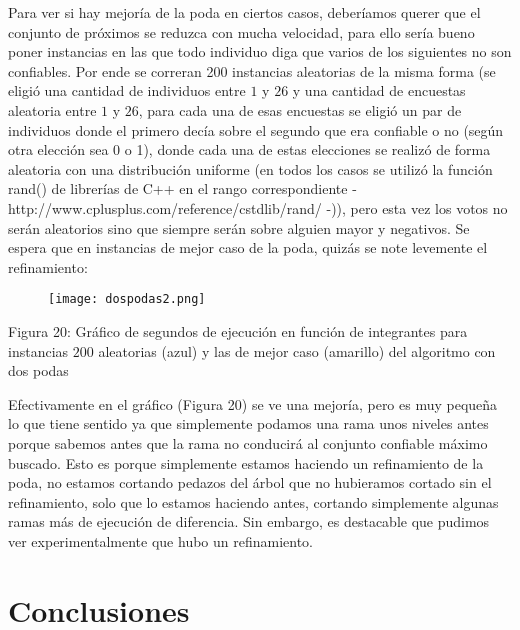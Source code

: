 \documentclass[A4paper,oneside,fleqn,10pt]{article}
\theoremstyle{definition}
\begin{document}
Para ver si hay mejoría de la poda en ciertos casos, deberíamos querer que el conjunto de próximos se reduzca con mucha velocidad, para ello sería bueno poner instancias en las que todo individuo diga que varios de los siguientes no son confiables. Por ende se correran 200 instancias aleatorias de la misma forma (se eligió una cantidad de individuos entre $1$ y $26$ y una cantidad de encuestas aleatoria entre $1$ y $26$, para cada una de esas encuestas se eligió un par de individuos donde el primero decía sobre el segundo que era confiable o no (según otra elección sea 0 o 1), donde cada una de estas elecciones se realizó de forma aleatoria con una distribución uniforme (en todos los casos se utilizó la función rand()  de librerías de C++ en el rango correspondiente - http://www.cplusplus.com/reference/cstdlib/rand/ -)), pero esta vez los votos no serán aleatorios sino que siempre serán sobre alguien mayor y negativos. Se espera que en instancias de mejor caso de la poda, quizás se note levemente el refinamiento:

\clearpage

\begin{figure}[!ht]
  \texttt{[image: dospodas2.png]}
    \label{fig:boat19}
 \end{figure}

\scriptsize
     Figura 20: Gráfico de segundos de ejecución en función de integrantes para instancias $200$ aleatorias (azul) y las de mejor caso (amarillo) del algoritmo con dos podas
\normalsize

Efectivamente en el gráfico (Figura 20) se ve una mejoría, pero es muy pequeña lo que tiene sentido ya que simplemente podamos una rama unos niveles antes porque sabemos antes que la rama no conducirá al conjunto confiable máximo buscado. Esto es porque simplemente estamos haciendo un refinamiento de la poda, no estamos cortando pedazos del árbol que no hubieramos cortado sin el refinamiento, solo que lo estamos haciendo antes, cortando simplemente algunas ramas más de ejecución de diferencia. Sin embargo, es destacable que pudimos ver experimentalmente que hubo un refinamiento.

\section{Conclusiones}
\end{document}
